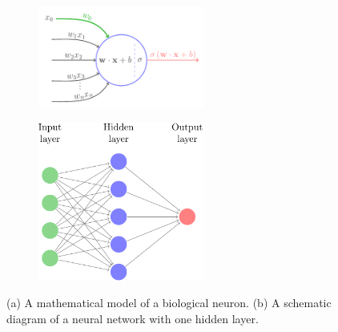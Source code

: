 \begin{figure}
  \centering
  \begin{subfigure}[]{0.49\linewidth}
    \centering
    \includegraphics[width=0.6\textwidth]{figures/neuron.pdf}
    \caption{}
    \label{fig:intro_neuron_a}
  \end{subfigure}
  \begin{subfigure}[]{0.49\linewidth}
    \centering
    \includegraphics[width=0.6\textwidth]{figures/network.pdf}
    \caption{}
    \label{fig:intro_neuron_b}
  \end{subfigure}
  \caption{
    (a) A mathematical model of a biological neuron.
    (b) A schematic diagram of a neural network with one hidden layer.
    }
\end{figure}


\clearpage

